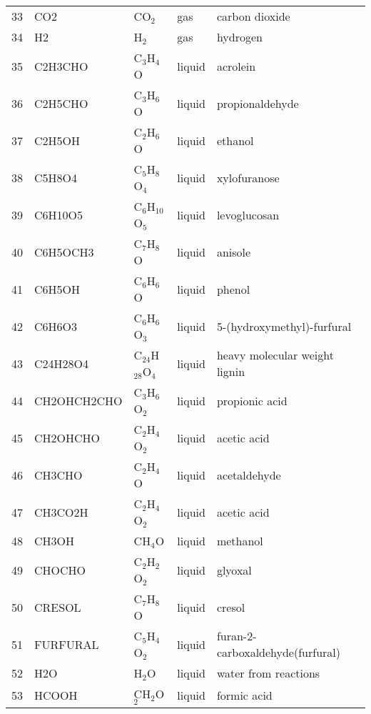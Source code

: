 \begin{center}
\begin{longtable}{lllll}
        33 & CO2            & CO$_2$                  & gas         & carbon dioxide \\
        34 & H2             & H$_2$                   & gas         & hydrogen \\
        35 & C2H3CHO        & C$_3$H$_4$O             & liquid      & acrolein \\
        36 & C2H5CHO        & C$_3$H$_6$O             & liquid      & propionaldehyde \\
        37 & C2H5OH         & C$_2$H$_6$O             & liquid      & ethanol \\
        38 & C5H8O4         & C$_5$H$_8$O$_4$         & liquid      & xylofuranose \\
        39 & C6H10O5        & C$_6$H$_{10}$O$_5$      & liquid      & levoglucosan \\
        40 & C6H5OCH3       & C$_7$H$_8$O             & liquid      & anisole \\
        41 & C6H5OH         & C$_6$H$_6$O             & liquid      & phenol \\
        42 & C6H6O3         & C$_6$H$_6$O$_3$         & liquid      & 5-(hydroxymethyl)-furfural \\
        43 & C24H28O4       & C$_{24}$H$_{28}$O$_4$   & liquid      & heavy molecular weight lignin \\
        44 & CH2OHCH2CHO    & C$_3$H$_6$O$_2$         & liquid      & propionic acid \\
        45 & CH2OHCHO       & C$_2$H$_4$O$_2$         & liquid      & acetic acid \\
        46 & CH3CHO         & C$_2$H$_4$O             & liquid      & acetaldehyde \\
        47 & CH3CO2H        & C$_2$H$_4$O$_2$         & liquid      & acetic acid \\
        48 & CH3OH          & CH$_4$O                 & liquid      & methanol \\
        49 & CHOCHO         & C$_2$H$_2$O$_2$         & liquid      & glyoxal \\
        50 & CRESOL         & C$_7$H$_8$O             & liquid      & cresol \\
        51 & FURFURAL       & C$_5$H$_4$O$_2$         & liquid      & furan-2-carboxaldehyde(furfural) \\
        52 & H2O            & H$_2$O                  & liquid      & water from reactions \\
        53 & HCOOH          & CH$_2$O$_2$             & liquid      & formic acid \\

\end{longtable}
\end{center}
